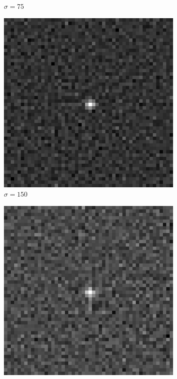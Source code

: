 \begin{figure}[htpb]
\begin{subfigure}{.25\textwidth}
\caption{$\sigma = 75$}
\end{subfigure}%
\begin{subfigure}{.25\textwidth}
\includegraphics[width=1\textwidth]{img/noiselessPOCsigma150}
\caption{$\sigma = 150$}
\end{subfigure}%
\begin{subfigure}{.25\textwidth}
\includegraphics[width=1\textwidth]{img/noiselessPOCsigma300}

\end{subfigure}
\end{figure}
